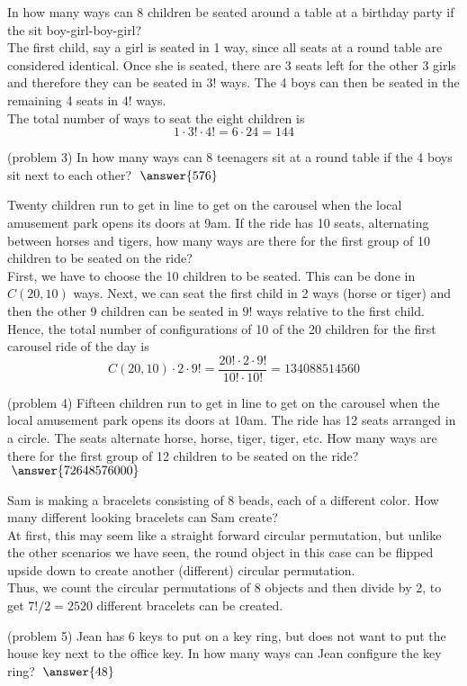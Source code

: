 \documentclass[handout]{ximera}
\begin{document}
\begin{example}[example 3]
In how many ways can 8 children be seated around a table at a birthday 
party if the sit boy-girl-boy-girl?\\
The first child, say a girl is seated in 1 way, since all seats at a round 
table are considered identical. Once she is seated, there are 3 seats left 
for the other 3 girls and therefore they can be seated in $3!$ ways.  
The 4 boys can then be seated in the remaining 4 seats in $4!$ ways.\\
The total number of ways to seat the eight children is 
\[
1\cdot 3! \cdot 4! = 6 \cdot 24 = 144
\]

\end{example}


\begin{problem}(problem 3)
In how many ways can 8 teenagers sit at a round table if the 4 boys sit next to each other?
$\; \answer{576}$
\end{problem}


\begin{example}[example 4]
Twenty children run to get in line to get on the carousel when the local amusement 
park opens its doors at 9am. If the ride has 10 seats, alternating between 
horses and tigers, how many ways are there for the first group of 10 
children to be seated on the ride?\\
First, we have to choose the 10 children to be seated.  This can be done in $C(20,10)$ ways.
Next, we can seat the first child in 2 ways (horse or tiger) and then the other 9 children 
can be seated in $9!$ ways relative to the first child.\\
Hence, the total number of configurations of 10 of the 20 children for the 
first carousel ride of the day is 
\[
C(20,10) \cdot 2 \cdot 9! = \frac{20! \cdot 2 \cdot 9!}{10!\cdot 10!} = 134088514560
\]
\end{example}


\begin{problem}(problem 4)
Fifteen children run to get in line to get on the carousel when the local amusement 
park opens its doors at 10am. The ride has 12 seats arranged in a circle. 
The seats alternate horse, horse, tiger, tiger, etc. 
How many ways are there for the first group of 12 
children to be seated on the ride? $\; \answer{72648576000}$

\end{problem}


\begin{example}[example 5]
Sam is making a bracelets consisting of 8 beads, each of a different color. 
How many different looking bracelets can Sam create?\\
At first, this may seem like a straight forward circular permutation, 
but unlike the other scenarios we have seen, the round object in this 
case can be flipped upside down to create another (different) circular permutation.\\
Thus, we count the circular permutations of $8$ objects and then divide by 2, to get
$7!/2 = 2520$ different bracelets can be created.
\end{example}


\begin{problem}(problem 5)
Jean has 6 keys to put on a key ring, but does not want to put the house key 
next to the office key.  In how many ways can Jean configure the key ring? $\; \answer{48}$
\end{problem}
\end{document}
